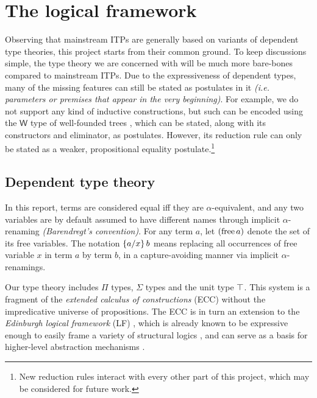 \documentclass[twoside]{report}
\begin{document}
\chapter{The logical framework}
\label{sec:logical_framework}

Observing that mainstream ITPs are generally based on variants of dependent type theories, this project starts from their common ground. To keep discussions simple, the type theory we are concerned with will be much more bare-bones compared to mainstream ITPs. Due to the expressiveness of dependent types, many of the missing features can still be stated as postulates in it \emph{(i.e. parameters or premises that appear in the very beginning)}. For example, we do not support any kind of inductive constructions, but such can be encoded using the $\mathsf W$ type of well-founded trees \cite{hugunin2021not}, which can be stated, along with its constructors and eliminator, as postulates. However, its reduction rule can only be stated as a weaker, propositional equality postulate.\footnote{New reduction rules interact with every other part of this project, which may be considered for future work.}

\section{Dependent type theory}
\label{sec:type_theory_standard}

In this report, terms are considered equal iff they are $\alpha$-equivalent, and any two variables are by default assumed to have different names through implicit $\alpha$-renaming \emph{(Barendregt's convention)}. For any term $a$, let $(\free a)$ denote the set of its free variables. The notation $\subst x a b$ means replacing all occurrences of free variable $x$ in term $a$ by term $b$, in a capture-avoiding manner via implicit $\alpha$-renamings.

Our type theory includes $\Pi$ types, $\Sigma$ types and the unit type $\unit$. This system is a fragment of the \emph{extended calculus of constructions} (ECC) \cite{luo1990extended,norell2007towards} without the impredicative universe of propositions. The ECC is in turn an extension to the \emph{Edinburgh logical framework} (LF) \cite{harper1993framework}, which is already known to be expressive enough to easily frame a variety of structural logics \cite{harper1993framework,pym1990proofs,cousineau2007embedding}, and can serve as a basis for higher-level abstraction mechanisms \cite{pollack2000dependently,sozeau2008first}.
\end{document}
